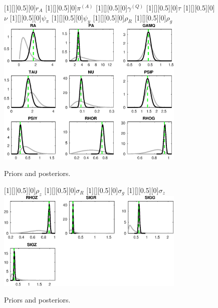 
\begin{figure}[H]
[1][][0.5][0]{$ {r_{A}} $}
[1][][0.5][0]{$ {\pi^{(A)}} $}
[1][][0.5][0]{$ {\gamma^{(Q)}} $}
[1][][0.5][0]{$ {\tau} $}
[1][][0.5][0]{$ {\nu} $}
[1][][0.5][0]{$ {\psi_\pi} $}
[1][][0.5][0]{$ {\psi_y} $}
[1][][0.5][0]{$ {\rho_R} $}
[1][][0.5][0]{$ {\rho_{g}} $}
\centering
\includegraphics[width=0.80\textwidth]{AnSchoModTheBuilder/Output/AnSchoModTheBuilder_PriorsAndPosteriors1}
\caption{Priors and posteriors.}\label{Fig:PriorsAndPosteriors:1}
\end{figure}
 
\begin{figure}[H]
[1][][0.5][0]{$ {\rho_z} $}
[1][][0.5][0]{$ {\sigma_R} $}
[1][][0.5][0]{$ {\sigma_{g}} $}
[1][][0.5][0]{$ {\sigma_z} $}
\centering
\includegraphics[width=0.80\textwidth]{AnSchoModTheBuilder/Output/AnSchoModTheBuilder_PriorsAndPosteriors2}
\caption{Priors and posteriors.}\label{Fig:PriorsAndPosteriors:2}
\end{figure}
 
